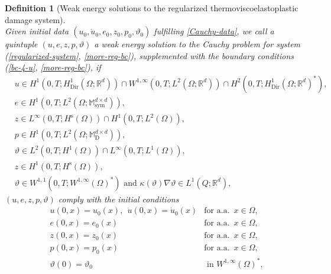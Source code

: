 \documentclass[a4paper,10pt,reqno]{amsart}
\numberwithin{equation}{section}
\newcommand{\bbM}{\mathbb{M}}
\newcommand{\R}{\mathbb{R}}
\numberwithin{equation}{section}
\newtheorem{definition}[theorem]{Definition}
\newcommand{\forae}{\text{for a.a. }}
\newcommand{\teta}{\vartheta}
\newcommand{\Dir}{\mathrm{Dir}}
\newcommand{\mt}{\bbM}
\newcommand{\sym}{\mathrm{sym}}
\newcommand{\dev}{\mathrm{D}}
\newcommand{\condu}{\kappa}
\newcommand{\spz}{H^{\mathrm{s}}(\Omega)}
\begin{document}
   \begin{definition}[Weak energy solutions to the regularized thermoviscoelastoplastic  damage system]
   \label{def:weak-sols}
   $ $\\
 Given initial data $(u_0, \dot{u}_0, e_0,z_0, p_0,\teta_0)$ fulfilling \eqref{Cauchy-data}, we call a quintuple $(u,e,z,p,\teta)$
a \emph{weak energy solution} to the Cauchy problem for system (\ref{regularized-system}, \ref{more-reg-bc}),
 supplemented with the boundary conditions 
 (\ref{bc-4-u}, \ref{more-reg-bc}),   
   if
\begin{subequations}
\label{regularity}
\begin{align}
& \label{reg-u} u \in H^1(0,T; H_\Dir^{1}(\Omega;\R^d)) \cap W^{1,\infty}(0,T; L^2(\Omega;\R^d)) \cap H^2(0,T; H_\Dir^{1}(\Omega;\R^d)^*),
\\
 & \label{reg-e} e \in H^1(0,T; L^2(\Omega;\mt_\sym^{d\times d})),
 \\
 & \label{reg-z} z \in L^\infty(0,T;\spz) \cap H^1(0,T;L^2(\Omega)),
\\
& \label{reg-p} p \in H^1(0,T; L^2(\Omega;\mt_\dev^{d\times d})),
\\
& 
\label{reg-teta}  \teta \in  L^2(0,T; H^1(\Omega))\cap L^\infty(0,T;L^1(\Omega)),
\\
&
\label{further-reg-z}
z\in H^1(0,T;\spz),
\\
&
 \label{enh-teta-W11}
 \teta \in W^{1,1}(0,T; W^{1,\infty}(\Omega)^*) \text{ and }  \condu(\teta) \nabla \teta \in L^1(Q;\R^d),
\end{align}
\end{subequations}
$(u,e,z,p,\teta)$ comply with
 the initial conditions
 \begin{subequations}
 \label{initial-conditions}
\begin{align}
 \label{iniu}  & u(0,x) = u_0(x), \ \ \dot{u}(0,x) = \dot{u}_0(x) & \forae\, x \in
 \Omega,
 \\
  \label{inie}  & e(0,x) = e_0(x)  & \forae\, x \in
 \Omega,
 \\
  \label{iniz}  & z(0,x) = z_0(x) & \forae\, x \in
 \Omega,
 \\
 \label{inip}  & p(0,x) = p_0(x) & \forae\, x \in
 \Omega,
 \\
 \label{initeta}
 &
\teta(0) = \teta_0  &  \text{ in } W^{1,\infty}(\Omega)^*,

\end{align}
\end{subequations}
\end{definition}
\end{document}
